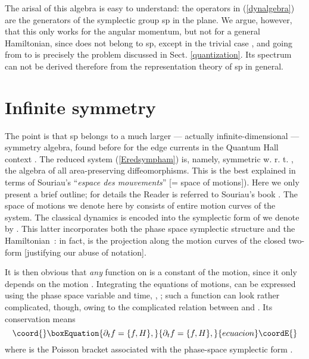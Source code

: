 \documentclass[a4paper,11pt]{article}
\let\ssection=\section
\renewcommand{\section}{\setcounter{equation}{0}\ssection}
\def\p{{\partial}}
\begin{document}
The arisal of this algebra is easy to
understand: the operators in (\ref{dynalgebra}) are the generators
of the symplectic group sp\coordHE{} in the plane.
We argue, however, that this only works for the angular
momentum, but not for a general Hamiltonian, since
\coordHE{} does not belong to sp\coordHE{},
except in the trivial case \coordHE{}, and going from
\coordHE{} to \coordHE{} is precisely the problem discussed in
Sect. \ref{quantization}.
Its spectrum can not
be derived therefore from the representation theory of sp\coordHE{} in general.

\section{Infinite symmetry}

The point is that sp\coordHE{} belongs to a much
larger --- actually infinite-dimensional --- symmetry algebra,
found before for the edge currents
in the Quantum Hall context  \cite{Winfty}.
The reduced system (\ref{Eredsympham})
is, namely, symmetric w. r. t.
  \coordHE{}, the algebra of all area-preserving diffeomorphisms.
   This is the best explained in terms of Souriau's
``{\it espace des mouvements}'' [= space of motions]).
Here we only present a brief outline;
for details the Reader is referred to
Souriau's book \cite{SSD}.
The space of motions we denote here by \coordHE{}
consists of entire motion curves of the system. The classical
dynamics is encoded into the symplectic form of \coordHE{} we denote
by \myHighlight{$\sigma$}\coordHE{}. This latter incorporates both the phase space
symplectic structure and the Hamiltonian~: in fact, \myHighlight{$\sigma$}\coordHE{} is the
projection along the motion curves of the closed two-form \coordHE{} [justifying our abuse of notation].

It is then obvious that {\it any} function \coordHE{} on \coordHE{} is
a constant of the motion, since it only depends on the motion \myHighlight{$\zeta$}\coordHE{}.
Integrating the equations of motions, \coordHE{} can be expressed using
the phase space variable \myHighlight{$\xi$}\coordHE{} and time, \coordHE{},
\coordHE{};
such a function can look rather complicated, though,
owing to the complicated relation between \myHighlight{$\zeta$}\coordHE{} and \coordHE{}.
Its conservation means
\begin{equation}\coord{}\boxEquation{
     \p_{t}f=\{f,H\},
\label{conservation}
}{
     \p_{t}f=\{f,H\},
}{ecuacion}\coordE{}\end{equation}
where \myHighlight{$\{\cdot,\cdot\}$}\coordHE{} is the Poisson bracket associated
with the phase-space symplectic form \myHighlight{$\Omega$}\coordHE{}.
\end{document}
